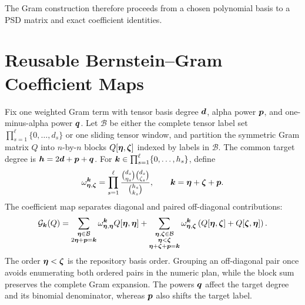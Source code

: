 The Gram construction therefore proceeds from a chosen polynomial basis to a PSD matrix and exact coefficient identities.

\begin{center}
\end{center}

\section{Reusable Bernstein--Gram Coefficient Maps}
\label{sec:certificate-gram-map}

Fix one weighted Gram term with tensor basis degree $\boldsymbol{d}$, alpha power $\boldsymbol{p}$, and one-minus-alpha power $\boldsymbol{q}$. Let $\mathcal B$ be either the complete tensor label set $\prod_{s=1}^{\ell}\{0,\ldots,d_s\}$ or one sliding tensor window, and partition the symmetric Gram matrix $Q$ into $n$-by-$n$ blocks $Q[\boldsymbol{\eta},\boldsymbol{\zeta}]$ indexed by labels in $\mathcal B$. The common target degree is $\boldsymbol{h}=2\boldsymbol{d}+\boldsymbol{p}+\boldsymbol{q}$. For $\boldsymbol{k}\in\prod_{s=1}^{\ell}\{0,\ldots,h_s\}$, define
\begin{gather*}
\omega_{\boldsymbol{\eta},\boldsymbol{\zeta}}^{\boldsymbol{k}}
=\prod_{s=1}^{\ell}
\frac{\binom{d_s}{\eta_s}\binom{d_s}{\zeta_s}}
{\binom{h_s}{k_s}},
\qquad
\boldsymbol{k}=\boldsymbol{\eta}+\boldsymbol{\zeta}+\boldsymbol{p}.
\end{gather*}
The coefficient map separates diagonal and paired off-diagonal contributions:
\begin{gather*}
\mathcal G_{\boldsymbol{k}}(Q)=
\sum_{\substack{\boldsymbol{\eta}\in\mathcal B\\2\boldsymbol{\eta}+\boldsymbol{p}=\boldsymbol{k}}}
\omega_{\boldsymbol{\eta},\boldsymbol{\eta}}^{\boldsymbol{k}}Q[\boldsymbol{\eta},\boldsymbol{\eta}]
+
\sum_{\substack{\boldsymbol{\eta},\boldsymbol{\zeta}\in\mathcal B\\\boldsymbol{\eta}<\boldsymbol{\zeta}\\\boldsymbol{\eta}+\boldsymbol{\zeta}+\boldsymbol{p}=\boldsymbol{k}}}
\omega_{\boldsymbol{\eta},\boldsymbol{\zeta}}^{\boldsymbol{k}}
\left(Q[\boldsymbol{\eta},\boldsymbol{\zeta}]+Q[\boldsymbol{\zeta},\boldsymbol{\eta}]\right).
\end{gather*}
The order $\boldsymbol{\eta}<\boldsymbol{\zeta}$ is the repository basis order. Grouping an off-diagonal pair once avoids enumerating both ordered pairs in the numeric plan, while the block sum preserves the complete Gram expansion. The powers $\boldsymbol{q}$ affect the target degree and its binomial denominator, whereas $\boldsymbol{p}$ also shifts the target label.

